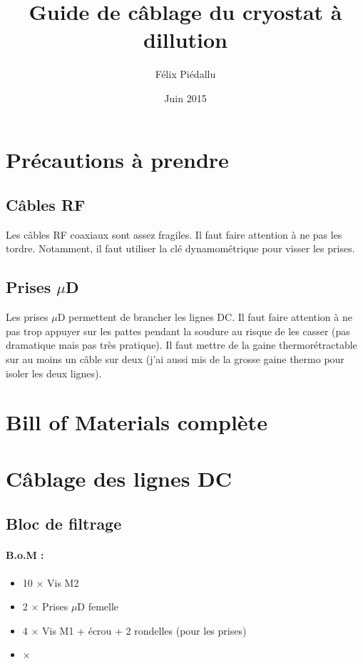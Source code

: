 \documentclass[a4paper,11pt]{article}
\title{Guide de câblage du cryostat à dillution}
\author{Félix Piédallu}
\date{Juin 2015}
\newcommand{\fois}{$\times$ }
\newcommand{\uD}{$\mu$D }
\newenvironment{BOM}
  {%
    \paragraph{B.o.M : } \begin{itemize}%
  }{%
    \end{itemize}\medskip%
  }
\begin{document}
\maketitle
\tableofcontents

\begin{abstract}
\end{abstract}

\section{Précautions à prendre}
\subsection{Câbles RF}
Les câbles RF coaxiaux sont assez fragiles. Il faut faire attention à ne pas les tordre. Notamment, il faut utiliser la clé dynamométrique pour visser les prises.

\subsection{Prises \uD}
Les prises \uD permettent de brancher les lignes DC. Il faut faire attention à ne pas trop appuyer sur les pattes pendant la soudure au risque de les casser (pas dramatique mais pas très pratique). Il faut mettre de la gaine thermorétractable sur au moins un câble sur deux (j'ai aussi mis de la grosse gaine thermo pour isoler les deux lignes).

\section{Bill of Materials complète}

\section{Câblage des lignes DC}
\subsection{Bloc de filtrage}
\label{subsec:DC/blocDeFiltrage}
\begin{BOM}
    \item 10 \fois Vis M2
    \item 2 \fois Prises \uD femelle
    \item 4 \fois Vis M1 + écrou + 2 rondelles (pour les prises)
    \item \fois 
\end{BOM}
\end{document}
